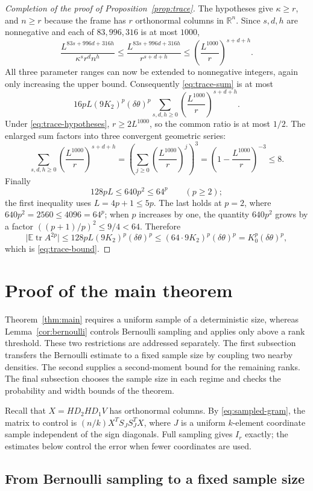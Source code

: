 \documentclass[11pt]{article}
\theoremstyle{definition}
\theoremstyle{remark}
\theoremstyle{plain}
\newcommand{\E}{\mathbb E}
\newcommand{\R}{\mathbb R}
\DeclareMathOperator{\tr}{tr}
\begin{document}
\begin{proof}[Completion of the proof of Proposition~\ref{prop:trace}]
The hypotheses give $\kappa\ge r$, and $n\ge r$ because the
frame has $r$ orthonormal columns in $\R^n$. Since $s,d,h$ are
nonnegative and each of $83,996,316$ is at most $1000$,
\[
 \frac{L^{83s+996d+316h}}{\kappa^s r^d n^h}
   \le\frac{L^{83s+996d+316h}}{r^{s+d+h}}
   \le\left(\frac{L^{1000}}r\right)^{s+d+h}.
\]
All three parameter ranges can now be extended to nonnegative
integers, again only increasing the upper bound. Consequently
\eqref{eq:trace-sum} is at most
\[
 16pL(9K_2)^p(\delta\theta)^p
          \sum_{s,d,h\ge0}\left(\frac{L^{1000}}r\right)^{s+d+h}.
\]
Under \eqref{eq:trace-hypotheses}, $r\ge2L^{1000}$, so the common
ratio is at most $1/2$. The enlarged sum factors into three
convergent geometric series:
\[
 \sum_{s,d,h\ge0}\left(\frac{L^{1000}}r\right)^{s+d+h}
   =\left(\sum_{j\ge0}\left(\frac{L^{1000}}r\right)^j\right)^3
   =\left(1-\frac{L^{1000}}r\right)^{-3}\le8.
\]
Finally
\[
 128pL\le640p^2\le64^p\qquad(p\ge2);
\]
the first inequality uses $L=4p+1\le5p$. The last holds at $p=2$,
where $640p^2=2560\le4096=64^p$; when $p$ increases by one,
the quantity $640p^2$ grows by a factor $((p+1)/p)^2\le9/4<64$.
Therefore
\[
 \bigl|\E\tr A^{2p}\bigr|
    \le128pL(9K_2)^p(\delta\theta)^p
    \le(64\cdot9K_2)^p(\delta\theta)^p
    =K_0^p(\delta\theta)^p,
\]
which is \eqref{eq:trace-bound}.
\end{proof}

\section{Proof of the main theorem}\label{sec:main-proof}

Theorem~\ref{thm:main} requires a uniform sample of a deterministic
size, whereas Lemma~\ref{cor:bernoulli} controls Bernoulli sampling
and applies only above a rank threshold. These two
restrictions are addressed separately. The first subsection transfers the Bernoulli
estimate to a fixed sample size by coupling two nearby densities.
The second supplies a second-moment bound for the remaining ranks.
The final subsection chooses the sample size in each regime and
checks the probability and width bounds of the theorem.

Recall that $X=HD_2HD_1V$ has orthonormal columns. By
\eqref{eq:sampled-gram}, the matrix to control is
$(n/k)X^TS_JS_J^TX$, where $J$ is a uniform $k$-element coordinate
sample independent of the sign diagonals. Full sampling gives $I_r$
exactly; the estimates below control the error when fewer coordinates are used.

\subsection{From Bernoulli sampling to a fixed sample size}
\end{document}
